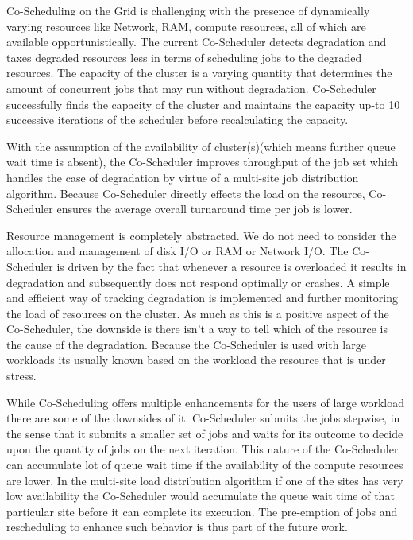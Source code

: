 \documentclass[ms,electronic,double]{nuthesis}
\begin{document}
Co-Scheduling on the Grid is challenging with the presence of dynamically varying 
resources like Network, RAM, compute resources, all of which are available opportunistically. 
The current Co-Scheduler 
detects degradation and taxes degraded resources less in terms of scheduling 
jobs to the degraded resources. The capacity of the cluster is a varying 
quantity that determines the amount of concurrent jobs that may run without 
degradation. Co-Scheduler successfully finds the capacity of the cluster and 
maintains the capacity up-to 10 successive iterations of the scheduler before 
recalculating the capacity.

With the assumption of the availability of cluster(s)(which means further queue wait time is 
absent), the Co-Scheduler improves throughput of the job set which handles the 
case of degradation by virtue of a multi-site job distribution algorithm. Because Co-Scheduler directly effects the load on the resource, Co-Scheduler 
ensures the average overall turnaround time per job is lower.

Resource management is completely abstracted. We do not need to consider the 
allocation and management of disk I/O or RAM or Network I/O. The Co-Scheduler is 
driven by the fact that whenever a resource is overloaded it results in 
degradation and subsequently does not respond optimally or crashes. A simple and 
efficient way of tracking degradation is implemented and further monitoring the load of 
resources on the cluster. As much as this is a positive aspect of the 
Co-Scheduler, the downside is there isn't a way to tell which of the resource is 
the cause of the degradation. Because the Co-Scheduler is used with large workloads its usually known based on 
the workload the resource that is under stress.

While Co-Scheduling offers multiple enhancements for the users of large workload 
there are some of the downsides of it. Co-Scheduler submits the jobs stepwise, in 
the sense that it submits a smaller set of jobs and waits for its outcome to decide upon the quantity 
of jobs on the next iteration. This 
nature of the Co-Scheduler can accumulate lot of queue wait time if the availability 
of the compute resources are lower. In the multi-site load distribution 
algorithm if one of the sites has very low availability the Co-Scheduler would 
accumulate the queue wait time of that particular site before it can complete 
its execution. The pre-emption of jobs and rescheduling to enhance such 
behavior is thus part of the future work.
\end{document}

